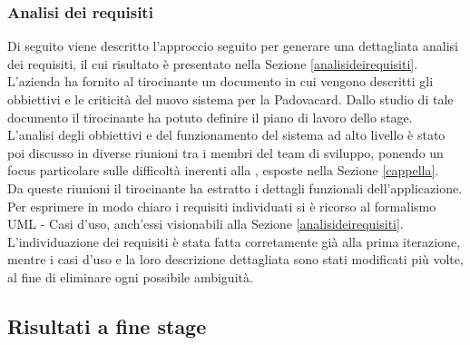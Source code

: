 \subsubsection{Analisi dei requisiti}
Di seguito viene descritto l'approccio seguito per generare una dettagliata analisi dei requisiti, il cui risultato è presentato nella Sezione \ref{analisideirequisiti}.
L'azienda \net ha fornito al tirocinante un documento in cui vengono descritti gli obbiettivi e le criticità del nuovo sistema per la Padovacard. Dallo studio di tale documento il tirocinante ha potuto definire il piano di lavoro dello stage.\\

L'analisi degli obbiettivi e del funzionamento del sistema ad alto livello è stato poi discusso in diverse riunioni tra i membri del team di sviluppo, ponendo un focus particolare sulle difficoltà inerenti alla \cappella, esposte nella Sezione \ref{cappella}.\\

Da queste riunioni il tirocinante ha estratto i dettagli funzionali dell’applicazione.
Per esprimere in modo chiaro i requisiti individuati si è ricorso al formalismo UML - Casi d'uso, anch'essi visionabili alla Sezione \ref{analisideirequisiti}.\\

L'individuazione dei requisiti è stata fatta corretamente già alla prima iterazione, mentre i casi d'uso e la loro descrizione dettagliata sono stati modificati più volte, al fine di eliminare ogni possibile ambiguità.
\subsection{Risultati a fine stage}